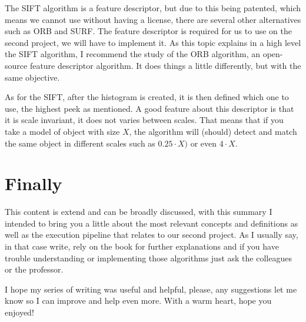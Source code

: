 \documentclass{article}
\begin{document}
The SIFT algorithm is a feature descriptor, but due to this being patented, which means we cannot use without having a license, there are several other alternatives such as ORB and SURF. The feature descriptor is required for us to use on the second project, we will have to implement it. As this topic explains in a high level the SIFT algorithm, I recommend the study of the ORB algorithm, an open-source feature descriptor algorithm. It does things a little differently, but with the same objective.

As for the SIFT, after the histogram is created, it is then defined which one to use, the highest peek as mentioned. A good feature about this descriptor is that it is scale invariant, it does not varies between scales. That means that if you take a model of object with size \(X\), the algorithm will (should) detect and match the same object in different scales such as \(0.25\cdot X)\) or even \(4\cdot X\). 


\section{Finally}
This content is extend and can be broadly discussed, with this summary I intended to bring you a little about the most relevant concepts and definitions as well as the execution pipeline that relates to our second project. As I usually say, in that case write, rely on the book for further explanations and if you have trouble understanding or implementing those algorithms just ask the colleagues or the professor.

I hope my series of writing was useful and helpful, please, any suggestions let me know so I can improve and help even more.
With a warm heart, hope you enjoyed!

\printbibliography
\end{document}
